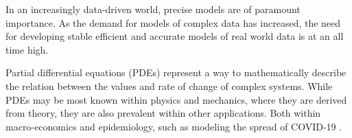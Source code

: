 In an increasingly data-driven world, precise models are of paramount importance.
As the demand for models of complex data has increased, the need for developing stable efficient and accurate models of real world data is at an all time high.

Partial differential equations (PDEs) represent a way to mathematically describe the relation between the values and rate of change of complex systems.
While PDEs may be most known within physics and mechanics, where they are derived from theory, they are also prevalent within other applications.
Both within macro-economics \cite{ecoPDE} and epidemiology, such as modeling the spread of COVID-19 \cite{covidus}.